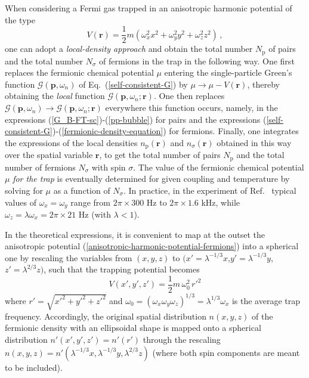 \documentclass[pra,twocolumn,aps,amssymb,showpacs,superscriptaddress]{revtex4-1}
\begin{document}
When considering a Fermi gas trapped in an anisotropic harmonic potential of the type
\begin{equation}
V(\mathbf{r}) = \frac{1}{2} m \left( \omega_{x}^{2} x^{2} + \omega_{y}^{2} y^{2} + \omega_{z}^{2} z^{2} \right) \, ,
\label{anisotropic-harmonic-potential-fermions}
\end{equation}
one can adopt a \emph{local-density approach} and obtain the total number $N_{\mathrm{p}}$ of pairs and the total number $N_{\sigma}$ of fermions in the trap in the following way.
One first replaces the fermionic chemical potential $\mu$ entering the single-particle Green's function $\mathcal{G}(\mathbf{p},\omega_{n})$ of Eq.~(\ref{self-consistent-G})
by $\mu \rightarrow \mu - V(\mathbf{r})$, thereby obtaining the \emph{local} function $\mathcal{G}(\mathbf{p},\omega_{n};\mathbf{r})$.
One then replaces $\mathcal{G}(\mathbf{p},\omega_{n}) \rightarrow \mathcal{G}(\mathbf{p},\omega_{n};\mathbf{r})$ everywhere this function occurs, namely, in the expressions (\ref{G_B-FT-sc})-(\ref{pp-bubble}) for pairs and the expressions (\ref{self-consistent-G})-(\ref{fermionic-density-equation}) for fermions.
Finally, one integrates the expressions of the local densities $n_{\mathrm{p}}(\mathbf{r})$ and $n_{\sigma}(\mathbf{r})$ obtained in this way over the spatial variable $\mathbf{r}$, to get the total number of pairs $N_{\mathrm{p}}$ and the total number of fermions $N_{\sigma}$ with spin $\sigma$.
The value of the fermionic chemical potential $\mu$ \emph{for the trap} is eventually determined for given coupling and temperature by solving for $\mu$ as a function of $N_{\sigma}$.
In practice, in the experiment of Ref.~\cite{Ulm-Cam-2019} typical values of $\omega_{x} = \omega_{y}$ range from $2 \pi \times 300$ Hz to $2 \pi \times 1.6$ kHz, while
$\omega_{z} = \lambda \omega_{x} = 2 \pi \times 21$ Hz (with $\lambda < 1$).

In the theoretical expressions, it is convenient to map at the outset the anisotropic potential (\ref{anisotropic-harmonic-potential-fermions}) into a spherical one by rescaling the variables
from $(x,y,z)$ to $(x' = \lambda^{-1/3} x$,$y' = \lambda^{-1/3} y$,$z' = \lambda^{2/3} z)$, such that the trapping potential becomes
\begin{equation}
V(x',y',z') = \frac{1}{2} m \, \omega_{0}^{2} \, r'^{2}
\label{isotropic-harmonic-potential-fermions}
\end{equation} 
where $r' = \sqrt{x'^{2} + y'^{2} + z'^{2}}$ and $\omega_{0} = (\omega_{x} \omega_{y} \omega_{z})^{1/3} = \lambda^{1/3} \omega_{x}$ is the average trap frequency.
Accordingly, the original spatial distribution $n(x,y,z)$ of the fermionic density with an ellipsoidal shape is mapped onto a spherical distribution $n'(x',y',z') = n'(r')$ through the rescaling 
$n(x,y,z) = n'(\lambda^{-1/3}x,\lambda^{-1/3}y,\lambda^{2/3}z)$ (where both spin components are meant to be included).
\end{document}
